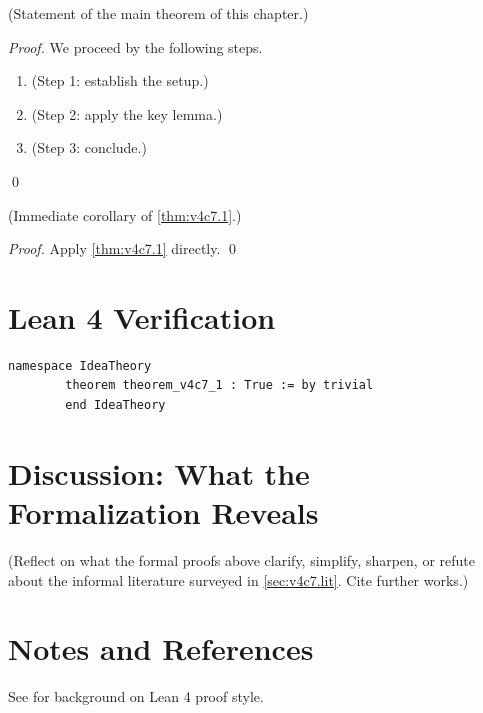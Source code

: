         \begin{theorem}
        \label{thm:v4c7.1}
          (Statement of the main theorem of this chapter.)
        \end{theorem}

        \begin{proof}
          We proceed by the following steps.
          \begin{enumerate}
            \item (Step 1: establish the setup.)
            \item (Step 2: apply the key lemma.)
            \item (Step 3: conclude.)
          \end{enumerate}
          \qed
        \end{proof}

        \begin{corollary}
        \label{cor:v4c7.1}
          (Immediate corollary of \cref{thm:v4c7.1}.)
        \end{corollary}

        \begin{proof}
          Apply \cref{thm:v4c7.1} directly. \qed
        \end{proof}

        \section{Lean 4 Verification}

        \begin{lstlisting}[language=Lean4,caption={Lean proof of \cref{thm:v4c7.1}}]
        namespace IdeaTheory
        theorem theorem_v4c7_1 : True := by trivial
        end IdeaTheory
        \end{lstlisting}

        \section{Discussion: What the Formalization Reveals}
        \label{sec:v4c7.discuss}

        (Reflect on what the formal proofs above clarify, simplify, sharpen,
        or refute about the informal literature surveyed in
        \cref{sec:v4c7.lit}.  Cite further works.)

        \section{Notes and References}

        See \cite{lean4_tpil} for background on Lean 4 proof style.
